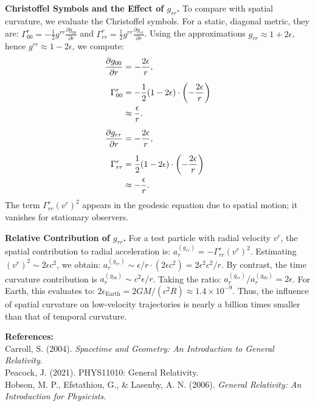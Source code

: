 \begin{technical}
\textbf{Christoffel Symbols and the Effect of \( g_{rr} \).}  
To compare with spatial curvature, we evaluate the Christoffel symbols. For a static, diagonal metric, they are: \( \Gamma^r_{00} = -\frac{1}{2} g^{rr} \frac{\partial g_{00}}{\partial r} \) and \( \Gamma^r_{rr} = \frac{1}{2} g^{rr} \frac{\partial g_{rr}}{\partial r} \).
Using the approximations \( g_{rr} \approx 1 + 2\epsilon \), hence \( g^{rr} \approx 1 - 2\epsilon \), we compute:
\begin{align*}
\frac{\partial g_{00}}{\partial r} &= -\frac{2\epsilon}{r}, \\[0.5em]
\Gamma^r_{00} &= -\frac{1}{2} (1 - 2\epsilon) \cdot \left(-\frac{2\epsilon}{r}\right) \notag \\
&\approx \frac{\epsilon}{r}. \\[0.5em]
\frac{\partial g_{rr}}{\partial r} &= -\frac{2\epsilon}{r}, \\[0.5em]
\Gamma^r_{rr} &= \frac{1}{2} (1 - 2\epsilon) \cdot \left(-\frac{2\epsilon}{r} \right) \notag \\
&\approx -\frac{\epsilon}{r}.
\end{align*}
The term \( \Gamma^r_{rr} (v^r)^2 \) appears in the geodesic equation due to spatial motion; it vanishes for stationary observers.

\textbf{Relative Contribution of \( g_{rr} \).}  
For a test particle with radial velocity \( v^r \), the spatial contribution to radial acceleration is: \( a_r^{(g_{rr})} = -\Gamma^r_{rr} (v^r)^2 \).
Estimating \( (v^r)^2 \sim 2\epsilon c^2 \), we obtain: \( a_r^{(g_{rr})} \sim \epsilon/r \cdot (2\epsilon c^2) = 2\epsilon^2 c^2/r \).
By contrast, the time curvature contribution is \( a_r^{(g_{00})} \sim c^2 \epsilon/r \). Taking the ratio: \( a_r^{(g_{rr})}/a_r^{(g_{00})} = 2\epsilon \).
For Earth, this evaluates to: \( 2\epsilon_{\text{Earth}} = 2GM/(c^2 R) \approx 1.4 \times 10^{-9} \).
Thus, the influence of spatial curvature on low-velocity trajectories is nearly a billion times smaller than that of temporal curvature.

\vspace{0.5em}
\noindent\textbf{References:}\\
{\footnotesize
Carroll, S. (2004). \textit{Spacetime and Geometry: An Introduction to General Relativity}. \\
Peacock, J. (2021). PHYS11010: General Relativity. \\
Hobson, M. P., Efstathiou, G., \& Lasenby, A. N. (2006). \textit{General Relativity: An Introduction for Physicists.}
}
\end{technical}    